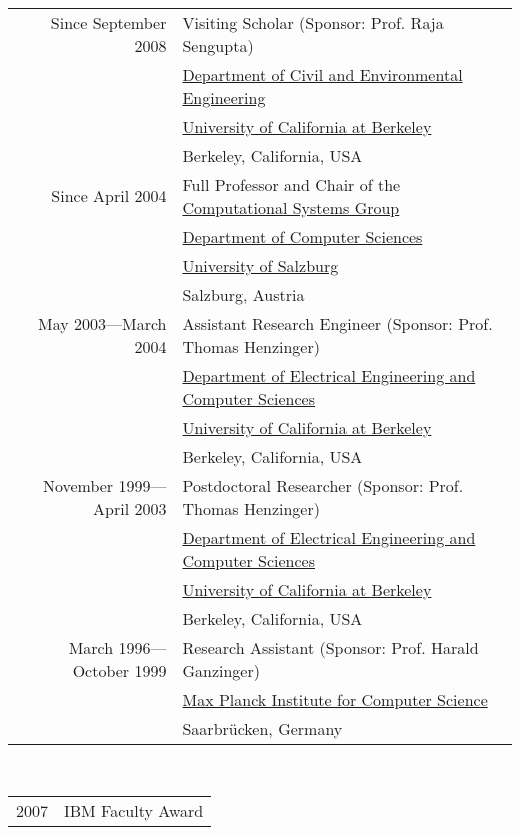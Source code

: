  \\
\begin{tabular}{rl}
Since September 2008 & Visiting Scholar (Sponsor: Prof. Raja Sengupta)\\
                     & \href{http://www.ce.berkeley.edu}{Department of Civil and Environmental Engineering} \\
                     & \href{http://www.berkeley.edu}{University of California at Berkeley} \\
                     & Berkeley, California, USA \\
\noalign{\smallskip}
Since April 2004 & Full Professor and Chair of the \href{http://www.cs.uni-salzburg.at/~ck/group}{Computational Systems Group} \\ %
                 & \href{http://www.cs.uni-salzburg.at}{Department of Computer Sciences} \\
                 & \href{http://www.sbg.ac.at}{University of Salzburg} \\
                 & Salzburg, Austria \\
\noalign{\smallskip}
May 2003---March 2004 & Assistant Research Engineer (Sponsor: Prof. Thomas Henzinger)\\
                 & \href{http://www.eecs.berkeley.edu}{Department of Electrical Engineering and Computer Sciences} \\
                 & \href{http://www.berkeley.edu}{University of California at Berkeley} \\
                 & Berkeley, California, USA \\
\noalign{\smallskip}
November 1999---April 2003 & Postdoctoral Researcher (Sponsor: Prof. Thomas Henzinger)\\
                 & \href{http://www.eecs.berkeley.edu}{Department of Electrical Engineering and Computer Sciences} \\
                 & \href{http://www.berkeley.edu}{University of California at Berkeley} \\
                 & Berkeley, California, USA \\
\noalign{\smallskip}
March 1996---October 1999 & Research Assistant (Sponsor: Prof. Harald Ganzinger)\\
                 & \href{http://www.mpi-sb.mpg.de}{Max Planck Institute for Computer Science} \\
                 & Saarbr{\"u}cken, Germany \\
\end{tabular}

 \\
\begin{tabular}{rl}
2007 & IBM Faculty Award
\end{tabular}

\newpage

